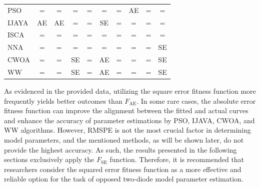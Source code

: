 \documentclass[a4paper,fleqn]{cas-sc}
\begin{document}
\begin{table}[<options>]
\begin{tabular*}{\tblwidth}{@{}LCCCCCCCCC@{}}
PSO &=  &=  &=  &=  &=  &=  & AE &=  &=  \\
IJAYA & AE & AE & = &=  &SE & = & = &=  &=  \\
ISCA &=  &=  &=  &=  &=  &=  &=  &=  &=  \\
NNA &=  &=  &=  &=  &=  &=  &=  &=  & SE\\
CWOA &=  &=  & SE&=  &  AE&=  &=  &=  &SE \\
WW &=  &=  & SE& = & AE & = &=  &=  & SE\\
\bottomrule
\end{tabular*}
\end{table}

As evidenced in the provided data, utilizing the square error fitness function more frequently yields better outcomes than $F_\mathrm{AE}$.
In some rare cases, the absolute error fitness function can improve the alignment
between the fitted and actual curves and
enhance the accuracy of parameter estimations by PSO, IJAVA, CWOA, and WW algorithms.
However, RMSPE is not the most crucial factor in determining model parameters, and the mentioned methods,
as will be shown later, do not provide the highest accuracy.
As such, the results presented in the following sections exclusively apply the $F_\mathrm{SE}$ function.
Therefore, it is recommended that researchers consider
the squared error fitness function as a more effective and reliable option for the task of opposed two-diode model parameter estimation.
\end{document}
